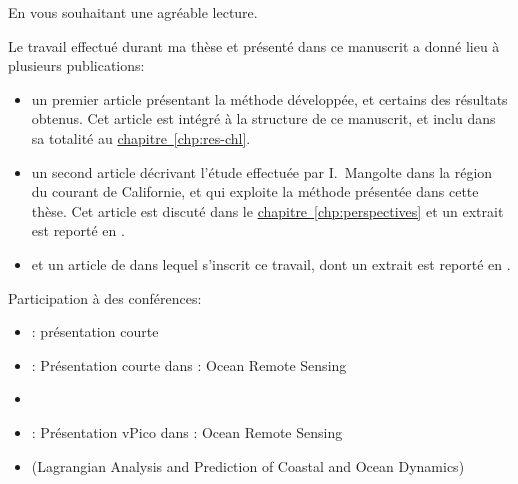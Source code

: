 En vous souhaitant une agréable lecture.

\clearpage
\thispagestyle{thesis-empty}

\label{sec:productions}

\begingroup
{}
Le travail effectué durant ma thèse et présenté dans ce manuscrit a donné lieu à plusieurs publications:
\begin{itemize}
  \setlength{\itemsep}{2\baselineskip}
  \renewcommand*\labelitemi{\adfrightarrowhead}
  \item un premier article présentant la méthode développée, et certains des résultats obtenus.
        Cet article est intégré à la structure de ce manuscrit, et inclu dans sa totalité au \hyperref[sec:article-bg]{chapitre~\ref*{chp:res-chl}}.

  \item un second article décrivant l'étude effectuée par I.\ Mangolte dans la région du courant de Californie, et qui exploite la méthode présentée dans cette thèse. Cet article est discuté dans le \hyperref[sec:cce]{chapitre~\ref*{chp:perspectives}} et un extrait est reporté en .

  \item et un article de  dans lequel s’inscrit ce travail,
        dont un extrait est reporté en .

\end{itemize}
\endgroup

\bigskip

Participation à des conférences:
\begin{itemize}
  \item {}: présentation courte
  \item {}: Présentation courte dans : Ocean Remote Sensing
  \item {}
  \item {}: Présentation vPico dans : Ocean Remote Sensing
  \item {} (Lagrangian Analysis and Prediction of Coastal and Ocean Dynamics)
\end{itemize}

